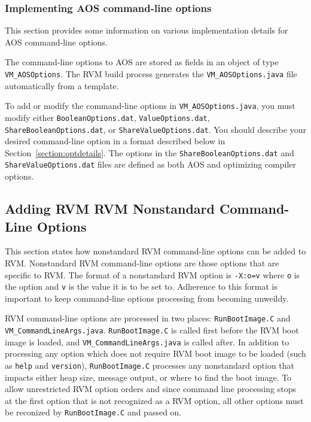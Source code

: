 \subsubsection{Implementing AOS command-line options}

This section provides some information on various
implementation details for AOS command-line options.

The command-line options to AOS are
stored as fields in an object of type {\tt VM\_AOSOptions}.
The RVM build process generates the {\tt VM\_AOSOptions.java} 
file automatically from a template.  

To add or modify the command-line options in {\tt VM\_AOSOptions.java},
you must modify either {\tt BooleanOptions.dat}, {\tt ValueOptions.dat},
{\tt ShareBooleanOptions.dat}, or {\tt ShareValueOptions.dat}.
You should describe your desired command-line option in a format 
described below in Section~\ref{section:optdetails}.
The options in the {\tt ShareBooleanOptions.dat} and {\tt ShareValueOptions.dat}
files are defined as both AOS and optimizing compiler options.

\subsection{Adding RVM RVM Nonstandard Command-Line Options}

This section states how nonstandard RVM command-line options can be added
to RVM.  
Nonstandard RVM command-line options are those options that are specific to RVM.
The format of a nonstandard RVM option is {\tt -X:o=v} where {\tt o} is the 
option and {\tt v} is the value it is to be set to.
Adherence to this format is important to keep command-line options processing
from becoming unweildy.

RVM command-line options are processed in two places: {\tt RunBootImage.C} and
{\tt VM\_CommandLineArgs.java}.  
{\tt RunBootImage.C} is called first before the RVM boot image is loaded,
and {\tt VM\_CommandLineArgs.java} is called after.
In addition to processing any option which does not require RVM boot image
to be loaded (such as {\tt help} and {\tt version}), 
{\tt RunBootImage.C} processes any nonstandard option that impacts either 
heap size, message output, or where to find the boot image.
To allow unrestricted RVM option orders and 
since command line processing stops at the first option that is not 
recognized as a RVM option, all other options must be reconized by
{\tt RunBootImage.C} and passed on.
